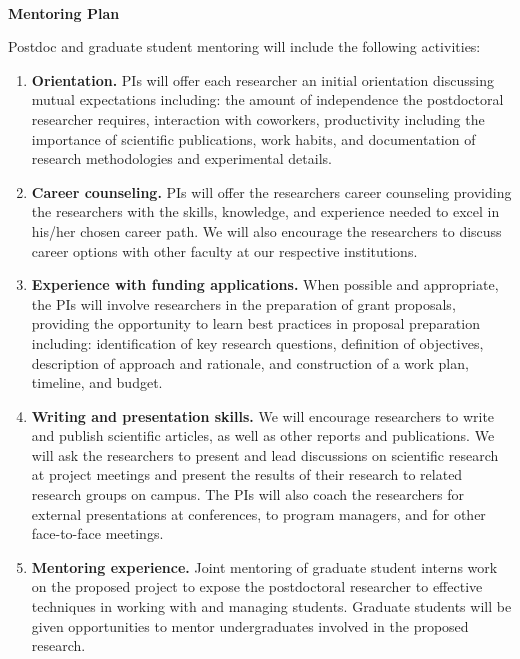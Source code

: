 \begin{center} 
    {\large \bf \TITLE } \\ 
    {\bf Mentoring Plan}
\end{center} 

\noindent
Postdoc and graduate student mentoring will include the
following activities:

\begin{enumerate}
    \itemsep=-1pt
    \item {\bf Orientation.} PIs will offer each researcher 
        an
        initial orientation discussing mutual expectations including: the
        amount of independence the postdoctoral researcher requires,
        interaction with coworkers, productivity including the importance of
        scientific publications, work habits, and documentation of research
        methodologies and experimental details.

    \item {\bf Career counseling.} PIs will offer the researchers
        career counseling providing the researchers with the
        skills, knowledge, and experience needed to excel in his/her chosen
        career path.  We will also encourage the researchers to
        discuss career options with other faculty at our respective
        institutions. 

\item {\bf Experience with funding applications.} When possible and
    appropriate, the PIs will involve researchers in the
        preparation of grant proposals, providing the opportunity to learn
        best practices in proposal preparation including: identification of
        key research questions, definition of objectives, description of
        approach and rationale, and construction of a work plan, timeline, and
        budget.

    \item {\bf Writing and presentation skills. }
       We will encourage researchers to
        write and publish scientific articles,
        as well as other reports and publications.  We will ask the
        researchers to present and lead discussions on scientific
        research at project meetings and present the results of their research
        to related research groups on campus. The PIs will also coach the
        researchers for external presentations at conferences, to
        program managers, and for other face-to-face meetings. 

\item {\bf Mentoring experience.} 
    Joint mentoring of graduate student interns work on the proposed project
    to expose the postdoctoral researcher to effective techniques in working
        with and managing students. Graduate students will be given
        opportunities to mentor undergraduates involved in the proposed
        research.


\end{enumerate}
